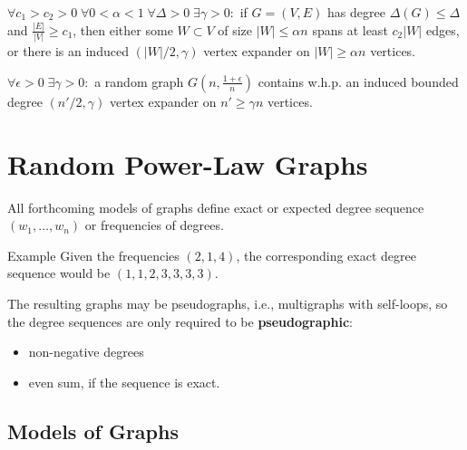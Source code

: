 \documentclass{beamer}
\newcommand{\autotitle}{\secname\ifdefempty{\subsecname}{}{~--- \subsecname}}
\newcommand{\clearsubsecname}{\long\def\subsecname{}}
\begin{document}
\begin{frame}{\autotitle}
    \begin{theorem}
        $\forall c_1>c_2>0\;\forall 0<\alpha<1\;\forall\Delta>0\;\exists\gamma>0:$
        if $G=(V,E)$ has degree $\Delta(G)\leq\Delta$ and $\frac{|E|}{|V|}\geq c_1$,
        then either some $W\subset V$ of size $|W|\leq\alpha n$ spans at least $c_2|W|$ edges,
        or there is an induced $(|W|/2,\gamma)$ vertex expander on $|W|\geq\alpha n$ vertices.
    \end{theorem}

    \begin{corollary}
        $\forall\epsilon>0\;\exists\gamma>0:$ a random graph $G\left(n,\frac{1+\epsilon}{n}\right)$
        contains w.h.p. an induced bounded degree $(n'/2,\gamma)$ vertex expander
        on $n'\geq\gamma n$ vertices.
    \end{corollary}
\end{frame}

\section{Random Power-Law Graphs}
\clearsubsecname

\begin{frame}{\autotitle}
    All forthcoming models of graphs define exact or expected
    degree sequence $(w_1,\ldots,w_n)$ or frequencies of degrees.
    \begin{exampleblock}{Example}
        Given the frequencies $(2,1,4)$, the corresponding exact degree sequence
        would be $(1,1,2,3,3,3,3)$.
    \end{exampleblock}

    The resulting graphs may be pseudographs, i.e., multigraphs with self-loops,
    so the degree sequences are only required to be \textbf{pseudographic}:
    \begin{itemize}
        \item non-negative degrees
        \item even sum, if the sequence is exact.
    \end{itemize}
\end{frame}

\subsection{Models of Graphs}
\end{document}
